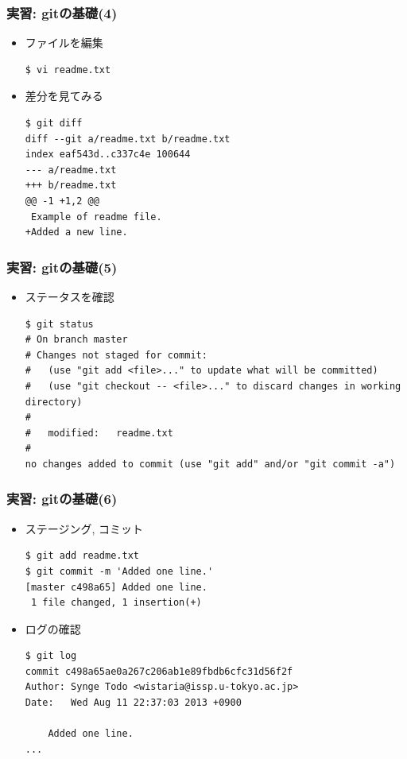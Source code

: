\begin{frame}[t,fragile]
  \frametitle{実習: gitの基礎(4)}
  \begin{itemize}
  \item ファイルを編集
\begin{lstlisting}
$ vi readme.txt
\end{lstlisting}
  \item 差分を見てみる
\begin{lstlisting}
$ git diff
diff --git a/readme.txt b/readme.txt
index eaf543d..c337c4e 100644
--- a/readme.txt
+++ b/readme.txt
@@ -1 +1,2 @@
 Example of readme file.
+Added a new line.
\end{lstlisting}
  \end{itemize}
\end{frame}

\begin{frame}[t,fragile]
  \frametitle{実習: gitの基礎(5)}
  \begin{itemize}
  \item ステータスを確認
\begin{lstlisting}
$ git status
# On branch master
# Changes not staged for commit:
#   (use "git add <file>..." to update what will be committed)
#   (use "git checkout -- <file>..." to discard changes in working directory)
#
#	modified:   readme.txt
#
no changes added to commit (use "git add" and/or "git commit -a")
\end{lstlisting}
  \end{itemize}
\end{frame}

\begin{frame}[t,fragile]
  \frametitle{実習: gitの基礎(6)}
  \begin{itemize}
  \item ステージング, コミット
\begin{lstlisting}
$ git add readme.txt
$ git commit -m 'Added one line.'
[master c498a65] Added one line.
 1 file changed, 1 insertion(+)
\end{lstlisting}
  \item ログの確認
\begin{lstlisting}
$ git log
commit c498a65ae0a267c206ab1e89fbdb6cfc31d56f2f
Author: Synge Todo <wistaria@issp.u-tokyo.ac.jp>
Date:   Wed Aug 11 22:37:03 2013 +0900

    Added one line.
...
\end{lstlisting}
  \end{itemize}
\end{frame}

